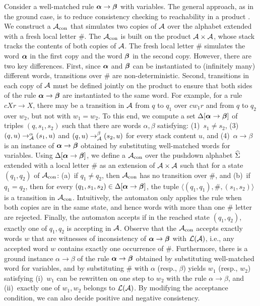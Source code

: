 \newcommand{\autCon}{\aut_{\textrm{con}}}
\newcommand{\DeltaRule}{\Delta[\lhs \to \rhs]}
Consider a well-matched rule $\boldsymbol{\alpha} \to \boldsymbol{\beta}$ with variables. 
The general approach, as in the ground case, is to reduce consistency checking to reachability in a product \VPA.
We construct a \VPA $\autCon$ that simulates two copies of $\mathcal{A}$ over the alphabet extended with a fresh local letter $\#$.
The \VPA $\autCon$ is built on the product $\mathcal{A} \times \mathcal{A}$, whose stack tracks the contents of both copies of $\mathcal{A}$.
The fresh local letter $\#$ simulates the word $\boldsymbol{\alpha}$ in the first copy and the word $\boldsymbol{\beta}$ in the second copy.
However, there are two key differences.
First, since $\boldsymbol{\alpha}$ and $\boldsymbol{\beta}$ can be instantiated to (infinitely many) different words, transitions over $\#$ are non-deterministic.
Second, transitions in each copy of $\mathcal{A}$ must be defined jointly on the product to ensure that both sides of the rule $\boldsymbol{\alpha} \to \boldsymbol{\beta}$ are instantiated to the same word. 
For example, for a rule $c X r \to X$, there may be a transition in $\mathcal{A}$ from $q$ to $q_1$ over $c w_1 r$ and from $q$ to $q_2$ over $w_2$, but not with $w_1 = w_2$.
To this end, we compute a set $\DeltaRule$ of triples $(q, s_1, s_2)$ such that there are words $\alpha, \beta$ satisfying:
(1)~$s_1 \neq s_2$, 
(3)~$(q,u) \rightarrow_{\mathcal{A}}^{\alpha} (s_1,u)$ and $(q,u) \rightarrow_{\mathcal{A}}^{\beta} (s_2,u)$ for every stack content $u$, and
(4)~$\alpha \to \beta$ is an instance  of $\boldsymbol{\alpha} \to \boldsymbol{\beta}$ obtained by substituting well-matched words for variables.
Using $\DeltaRule$, we define a \VPA $\autCon$ over the pushdown alphabet $\widehat{\Sigma}$ extended with a local letter $\#$ as an extension of $\mathcal{A} \times \mathcal{A}$ such that for a state $(q_1, q_2)$ of $\autCon$:
(a)~if $q_1 \neq q_2$, then $\autCon$ has no transition  over $\#$, and
(b)~if $q_1 = q_2$, then for every $(q_1, s_1, s_2) \in \DeltaRule$, 
the tuple $\langle (q_1, q_1), \#, (s_1, s_2) \rangle$ is a transition in $\autCon$. 
Intuitively, the automaton only applies the rule when both copies are in the same state, and hence words with more than one $\#$ letter are rejected.
Finally, the automaton accepts if in the reached state $(q_1, q_2)$, exactly one of $q_1, q_2$ is accepting in $\mathcal{A}$. 
Observe that the \VPA $\autCon$ accepts exactly words $w$ that are witnesses of inconsistency of $\boldsymbol{\alpha} \to \boldsymbol{\beta}$ with $\mathcal{L}(\mathcal{A})$, i.e., 
any accepted word $w$ contains exactly one occurrence of $\#$. 
Furthermore, there is a ground instance $\alpha \to \beta$ of the rule $\boldsymbol{\alpha} \to \boldsymbol{\beta}$ obtained by substituting well-matched word for variables, and 
by substituting $\#$ with $\alpha$ (resp., $\beta$) yields $w_1$ (resp., $w_2$) satisfying 
(i)~$w_1$ can be rewritten on one step to $w_2$ with the rule $\alpha \to \beta$, and 
(ii)~exactly one of $w_1, w_2$ belongs to $\mathcal{L}(\mathcal{A})$.
By modifying the acceptance condition, we can also decide positive and negative consistency. 

